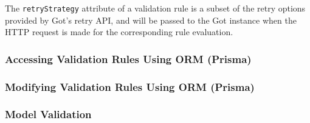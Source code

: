   The \verb;retryStrategy; attribute of a validation rule is a subset of the retry options provided by Got's retry API, and will be passed to the Got instance when the HTTP request is made for the corresponding rule evaluation. 

 \subsubsection{Accessing Validation Rules Using ORM (Prisma)} 

 \subsubsection{Modifying Validation Rules Using ORM (Prisma)}

 \subsubsection{Model Validation}